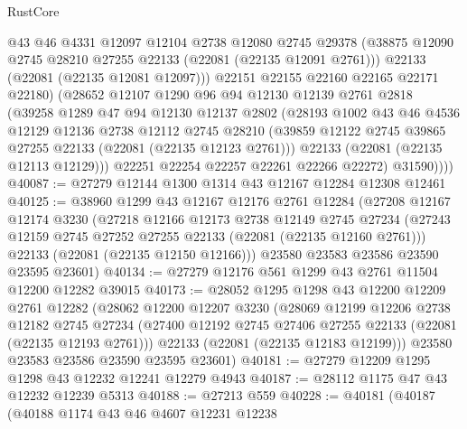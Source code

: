 \begin{lexlean}{RustCore}
\begin{coremodule}
              @43
              @46
              @4331
              @12097
              @12104
              @2738
              @12080
              @2745
              @29378
              (@38875 @12090 @2745 @28210 @27255 @22133 (@22081 (@22135 @12091 @2761)))
              @22133
              (@22081 (@22135 @12081 @12097)))
            @22151
            @22155
            @22160
            @22165
            @22171
            @22180)
          (@28652
            @12107
            @1290
            @96
            @94
            @12130
            @12139
            @2761
            @2818
            (@39258
              @1289
              @47
              @94
              @12130
              @12137
              @2802
              (@28193
                @1002
                @43
                @46
                @4536
                @12129
                @12136
                @2738
                @12112
                @2745
                @28210
                (@39859 @12122 @2745 @39865 @27255 @22133 (@22081 (@22135 @12123 @2761)))
                @22133
                (@22081 (@22135 @12113 @12129)))
              @22251
              @22254
              @22257
              @22261
              @22266
              @22272)
            @31590))))
@40087 := @27279 @12144 @1300 @1314 @43 @12167 @12284 @12308 @12461
@40125 := @38960
    @1299
    @43
    @12167
    @12176
    @2761
    @12284
    (@27208
      @12167
      @12174
      @3230
      (@27218
        @12166
        @12173
        @2738
        @12149
        @2745
        @27234
        (@27243 @12159 @2745 @27252 @27255 @22133 (@22081 (@22135 @12160 @2761)))
        @22133
        (@22081 (@22135 @12150 @12166)))
      @23580
      @23583
      @23586
      @23590
      @23595
      @23601)
@40134 := @27279 @12176 @561 @1299 @43 @2761 @11504 @12200 @12282 @39015
@40173 := @28052
    @1295
    @1298
    @43
    @12200
    @12209
    @2761
    @12282
    (@28062
      @12200
      @12207
      @3230
      (@28069
        @12199
        @12206
        @2738
        @12182
        @2745
        @27234
        (@27400 @12192 @2745 @27406 @27255 @22133 (@22081 (@22135 @12193 @2761)))
        @22133
        (@22081 (@22135 @12183 @12199)))
      @23580
      @23583
      @23586
      @23590
      @23595
      @23601)
@40181 := @27279 @12209 @1295 @1298 @43 @12232 @12241 @12279 @4943
@40187 := @28112 @1175 @47 @43 @12232 @12239 @5313
@40188 := @27213 @559
@40228 := @40181
    (@40187
      (@40188
        @1174
        @43
        @46
        @4607
        @12231
        @12238

\end{coremodule}
\end{lexlean}
